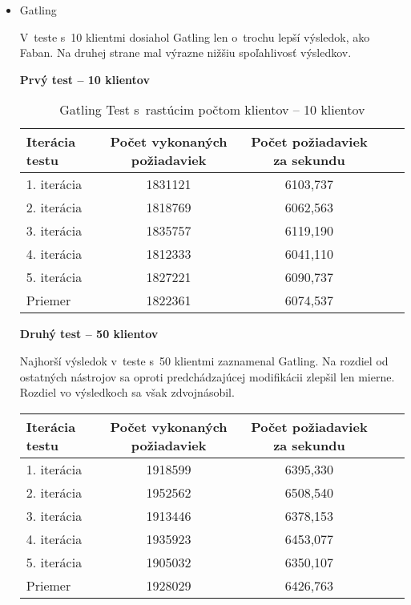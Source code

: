 \documentclass[12pt,oneside,final]{fithesis-utf8}
\begin{document}
\begin{itemize}
\item Gatling

V~teste s~10 klientmi dosiahol Gatling len o~trochu lepší výsledok, ako Faban. Na druhej strane mal výrazne nižšiu spoľahlivosť výsledkov.

\textbf{Prvý test -- 10 klientov}

\begin{table}[H]
\begin{center}
\begin{tabular}{ | l | c | c | c | c |}
		\hline
		 \textbf{Iterácia testu} & \textbf{Počet vykonaných požiadaviek} & \textbf{Počet požiadaviek za sekundu} \\ \hline
		 1. iterácia & 1831121 & 6103,737 \\ \hline
		 2. iterácia & 1818769 & 6062,563 \\ \hline
		 3. iterácia & 1835757 & 6119,190 \\ \hline
		 4. iterácia & 1812333 & 6041,110 \\ \hline
		 5. iterácia & 1827221 & 6090,737 \\ \hline
		 Priemer & 1822361 & 6074,537 \\ \hline
		 
\end{tabular}
\end{center}
\caption{Gatling Test s~rastúcim počtom klientov -- 10 klientov}
\end{table}


\textbf{Druhý test -- 50 klientov}

Najhorší výsledok v~teste s~50 klientmi zaznamenal Gatling. Na rozdiel od ostatných nástrojov sa oproti predchádzajúcej modifikácii zlepšil len mierne. Rozdiel vo výsledkoch sa však zdvojnásobil.

\begin{table}[H]
\begin{center}
\begin{tabular}{ | l | c | c | c | c |}
		\hline
		 \textbf{Iterácia testu} & \textbf{Počet vykonaných požiadaviek} & \textbf{Počet požiadaviek za sekundu} \\ \hline
		 1. iterácia & 1918599 & 6395,330 \\ \hline
		 2. iterácia & 1952562 & 6508,540 \\ \hline
		 3. iterácia & 1913446 & 6378,153 \\ \hline
		 4. iterácia & 1935923 & 6453,077 \\ \hline
		 5. iterácia & 1905032 & 6350,107 \\ \hline
		 Priemer & 1928029 & 6426,763 \\ \hline
		 

\end{tabular}
\end{center}
\end{table}
\end{itemize}
\end{document}

